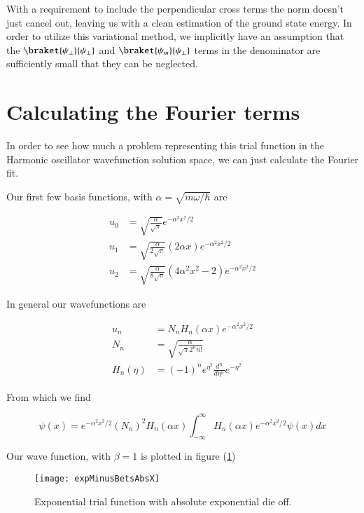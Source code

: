 With a requirement to include the perpendicular cross terms the norm doesn't just cancel out, leaving us with a clean estimation of the ground state energy.  In order to utilize this variational method, we implicitly have an assumption that the $\braket{\psi_\perp}{\psi_\perp}$ and $\braket{\psi_m}{\psi_\perp}$ terms in the denominator are sufficiently small that they can be neglected.

\section{Calculating the Fourier terms}

In order to see how much a problem representing this trial function in the Harmonic oscillator wavefunction solution space, we can just calculate the Fourier fit.

Our first few basis functions, with $\alpha = \sqrt{m \omega/\hbar}$ are

\begin{align*}
u_0 &= \sqrt{\frac{\alpha}{\sqrt{\pi}}} e^{-\alpha^2 x^2/2} \\
u_1 &= \sqrt{\frac{\alpha}{2 \sqrt{\pi}}} (2 \alpha x) e^{-\alpha^2 x^2/2} \\
u_2 &= \sqrt{\frac{\alpha}{8 \sqrt{\pi}}} (4 \alpha^2 x^2 - 2) e^{-\alpha^2 x^2/2}
\end{align*}

In general our wavefunctions are

\begin{align*}
u_n &= N_n H_n(\alpha x) e^{-\alpha^2 x^2/2} \\
N_n &= \sqrt{
\frac{\alpha}{\sqrt{\pi} 2^n n!}
} \\
H_n(\eta) &= (-1)^n e^{\eta^2} \frac{d^n}{d\eta^n} e^{-\eta^2}
\end{align*}

From which we find 

\begin{equation}\label{eqn:variationHarmonicOscillator:471}
\psi(x) = e^{-\alpha^2 x^2/2} (N_n)^2 H_n(\alpha x) \int_{-\infty}^\infty H_n(\alpha x) e^{-\alpha^2 x^2/2} \psi(x) dx
\end{equation}

Our wave function, with $\beta=1$ is plotted in figure (\ref{fig:variationHarmonicOscillator:expMinusBetsAbsX})

\begin{figure}[htp]
\centering
\texttt{[image: expMinusBetsAbsX]}
\caption{Exponential trial function with absolute exponential die off.}\label{fig:variationHarmonicOscillator:expMinusBetsAbsX}
\end{figure}

